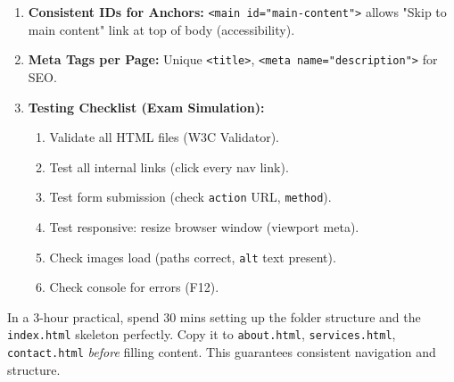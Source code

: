 \documentclass[11pt]{article}
\begin{document}
\begin{methode}
\begin{enumerate}
\begin{itemize}
        \end{itemize}
    \item \textbf{Consistent IDs for Anchors:} \texttt{<main id="main-content">} allows "Skip to main content" link at top of body (accessibility).
    \item \textbf{Meta Tags per Page:} Unique \texttt{<title>}, \texttt{<meta name="description">} for SEO.
    \item \textbf{Testing Checklist (Exam Simulation):}
        \begin{enumerate}
            \item Validate all HTML files (W3C Validator).
            \item Test all internal links (click every nav link).
            \item Test form submission (check \texttt{action} URL, \texttt{method}).
            \item Test responsive: resize browser window (viewport meta).
            \item Check images load (paths correct, \texttt{alt} text present).
            \item Check console for errors (F12).
        \end{enumerate}
\end{enumerate}
\begin{aretenir}
In a 3-hour practical, spend 30 mins setting up the folder structure and the \texttt{index.html} skeleton perfectly. Copy it to \texttt{about.html}, \texttt{services.html}, \texttt{contact.html} \emph{before} filling content. This guarantees consistent navigation and structure.
\end{aretenir}
\end{methode}
\end{document}
